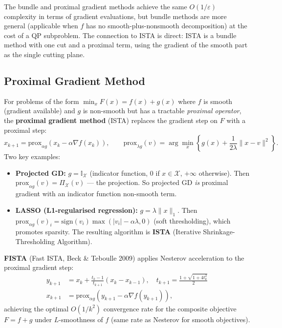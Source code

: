 \documentclass[11pt,a4paper]{article}
\theoremstyle{definition}
\begin{document}
The bundle and proximal gradient methods achieve the same $O(1/\varepsilon)$ complexity in terms of gradient evaluations, but bundle methods are more general (applicable when $f$ has no smooth-plus-nonsmooth decomposition) at the cost of a QP subproblem. The connection to ISTA is direct: ISTA is a bundle method with one cut and a proximal term, using the gradient of the smooth part as the single cutting plane.

\subsection{Proximal Gradient Method}

For problems of the form $\min_{x} F(x) = f(x) + g(x)$ where $f$ is smooth (gradient available) and $g$ is non-smooth but has a tractable \emph{proximal operator}, the \textbf{proximal gradient method} (ISTA) replaces the gradient step on $F$ with a proximal step:
\begin{equation}
x_{k+1} = \text{prox}_{\alpha g}(x_k - \alpha \nabla f(x_k)), \qquad \text{prox}_{\lambda g}(v) = \arg\min_x \left\{g(x) + \frac{1}{2\lambda}\|x - v\|^2\right\}.
\label{eq:prox_gd}
\end{equation}
Two key examples:
\begin{itemize}
\item \textbf{Projected GD:} $g = \mathbb{I}_{\mathcal{X}}$ (indicator function, $0$ if $x \in \mathcal{X}$, $+\infty$ otherwise). Then $\text{prox}_{\alpha g}(v) = \Pi_{\mathcal{X}}(v)$ --- the projection. So projected GD \emph{is} proximal gradient with an indicator function non-smooth term.
\item \textbf{LASSO (L1-regularised regression):} $g = \lambda\|x\|_1$. Then $\text{prox}_{\alpha g}(v)_i = \text{sign}(v_i)\max(|v_i| - \alpha\lambda, 0)$ (soft thresholding), which promotes sparsity. The resulting algorithm is \textbf{ISTA} (Iterative Shrinkage-Thresholding Algorithm).
\end{itemize}

\textbf{FISTA} (Fast ISTA, Beck \& Teboulle 2009) applies Nesterov acceleration to the proximal gradient step:
\begin{align}
y_{k+1} &= x_k + \frac{t_k - 1}{t_{k+1}}(x_k - x_{k-1}), \quad t_{k+1} = \frac{1 + \sqrt{1 + 4t_k^2}}{2} \nonumber \\
x_{k+1} &= \text{prox}_{\alpha g}(y_{k+1} - \alpha \nabla f(y_{k+1})),
\end{align}
achieving the optimal $O(1/k^2)$ convergence rate for the composite objective $F = f + g$ under $L$-smoothness of $f$ (same rate as Nesterov for smooth objectives).
\end{document}
